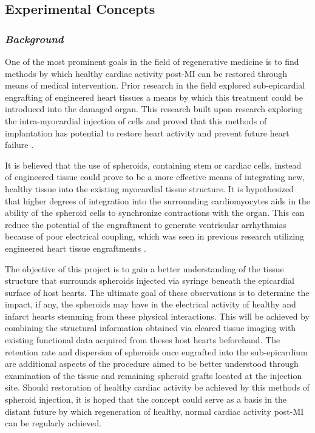 \subsection{Experimental Concepts}
\subsubsection{\textit{Background}}
One of the most prominent goals in the field of regenerative medicine is to find methods by which healthy cardiac activity post-MI can be restored through means of medical intervention. Prior research in the field explored sub-epicardial engrafting of engineered heart tissues a means by which this treatment could be introduced into the damaged organ. This research built upon research exploring the intra-myocardial injection of cells and proved that this methods of implantation has potential to restore heart activity and prevent future heart failure \cite{gerbin_winding_2015, huethorst_evidence_2025}. 

It is believed that the use of spheroids, containing stem or cardiac cells, instead of engineered tissue could prove to be a more effective means of integrating new, healthy tissue into the existing myocardial tissue structure. It is hypothesized that higher degrees of integration into the surrounding cardiomyocytes aids in the ability of the spheroid cells to synchronize contractions with the organ. This can reduce the potential of the engraftment to generate ventricular arrhythmias because of poor electrical coupling, which was seen in previous research utilizing engineered heart tissue engraftments \cite{gerbin_winding_2015}.

The objective of this project is to gain a better understanding of the tissue structure that surrounds spheroids injected via syringe beneath the epicardial surface of host hearts. The ultimate goal of these observations is to determine the impact, if any, the spheroids may have in the electrical activity of healthy and infarct hearts stemming from these physical interactions.  This will be achieved by combining the structural information obtained via cleared tissue imaging with existing functional data acquired from theses host hearts beforehand. The retention rate and dispersion of spheroids once engrafted into the sub-epicardium are additional aspects of the procedure aimed to be better understood through examination of the tissue and remaining spheroid grafts located at the injection site. Should restoration of healthy cardiac activity be achieved by this methods of spheroid injection, it is hoped that the concept could serve as a basis in the distant future by which regeneration of healthy, normal cardiac activity post-MI can be regularly achieved.  



